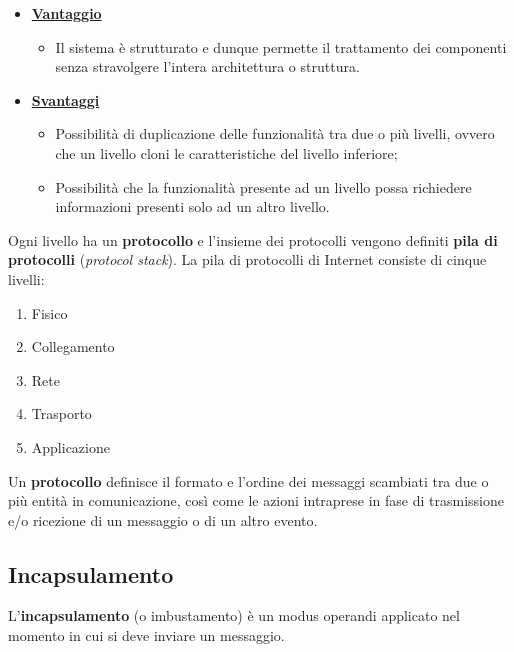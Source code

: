 \documentclass[a4paper]{article}
\begin{document}
	\begin{itemize}
		\item \textcolor{Green4}{\textbf{\underline{Vantaggio}}}
		\begin{itemize}
			\item Il sistema è strutturato e dunque permette il trattamento dei componenti senza stravolgere l'intera architettura o struttura.
		\end{itemize}
		
		\item \textcolor{Red3}{\textbf{\underline{Svantaggi}}}
		\begin{itemize}
			\item Possibilità di duplicazione delle funzionalità tra due o più livelli, ovvero che un livello cloni le caratteristiche del livello inferiore;
			
			\item Possibilità che la funzionalità presente ad un livello possa richiedere informazioni presenti solo ad un altro livello.
		\end{itemize}
	\end{itemize}

	\noindent
	Ogni livello ha un \textbf{protocollo} e l’insieme dei protocolli vengono definiti \textbf{pila di protocolli} (\emph{protocol stack}). La pila di protocolli di Internet consiste di cinque livelli:
	
	\begin{enumerate}
		\item Fisico
		\item Collegamento
		\item Rete
		\item Trasporto
		\item Applicazione
	\end{enumerate}

	\noindent
	Un \textcolor{Red3}{\textbf{protocollo}} definisce il formato e l’ordine dei messaggi scambiati tra due o più entità in comunicazione, così come le azioni intraprese in fase di trasmissione e/o ricezione di un messaggio o di un altro evento.
	
	\newpage
	
	\subsection{Incapsulamento}
	
	L'\textcolor{Red3}{\textbf{incapsulamento}} (o imbustamento) è un modus operandi applicato nel momento in cui si deve inviare un messaggio.
	
\end{document}
